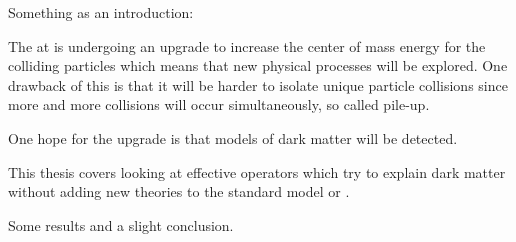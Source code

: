 Something as an introduction:

The \abbrLHC at \abbrCERN is undergoing an upgrade to increase the center of mass energy for the colliding particles which means that new physical processes will be explored. One drawback of this is that it will be harder to isolate unique particle collisions since more and more collisions will occur simultaneously, so called pile-up. 

One hope for the upgrade is that \abbrWIMP models of dark matter will be detected.

This thesis covers looking at effective operators which try to explain dark matter without adding new theories to the standard model or \abbrQFT . 
 

Some results and a slight conclusion.